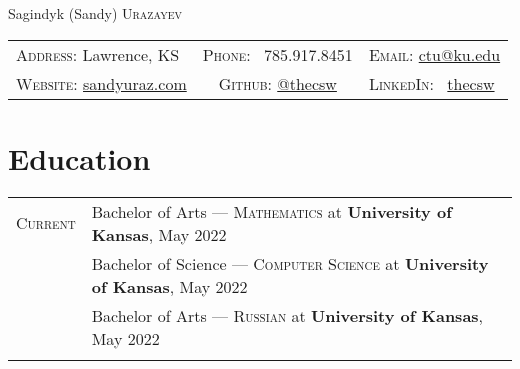 \documentclass[a4paper, 10pt]{article}
\begin{document}
\pagestyle{empty}
\enlargethispage{\baselineskip}

\par{\centering
	{\Huge Sagindyk (Sandy) \textsc{Urazayev}
	}\smallskip\par}

\begin{center}
	\begin{tabular}{lcl}
		\textsc{Address:}   Lawrence, KS                                 &
		\textsc{Phone:} \quad \ 785.917.8451                             &
		\textsc{Email:} \quad \href{mailto:ctu@ku.edu}{ctu@ku.edu}         \\

		\textsc{Website:} \href{https://sandyuraz.com}{sandyuraz.com}    &
		\textsc{Github:} \quad \href{https://github.com/thecsw}{@thecsw} &
		\textsc{LinkedIn:} \ \href{https://linkedin.com/in/thecsw}{thecsw} \\
	\end{tabular}
\end{center}

\section{Education}
\begin{tabular}{rl}
	\textsc{Current} & Bachelor of Arts --- \textsc{Mathematics} at \normalsize\textbf{University of Kansas}, May 2022         \\
	                 & Bachelor of Science --- \textsc{Computer Science} at \normalsize\textbf{University of Kansas}, May 2022 \\
	                 & Bachelor of Arts --- \textsc{Russian} at \normalsize\textbf{University of Kansas}, May 2022    \\

	\\
\end{tabular}
\end{document}
